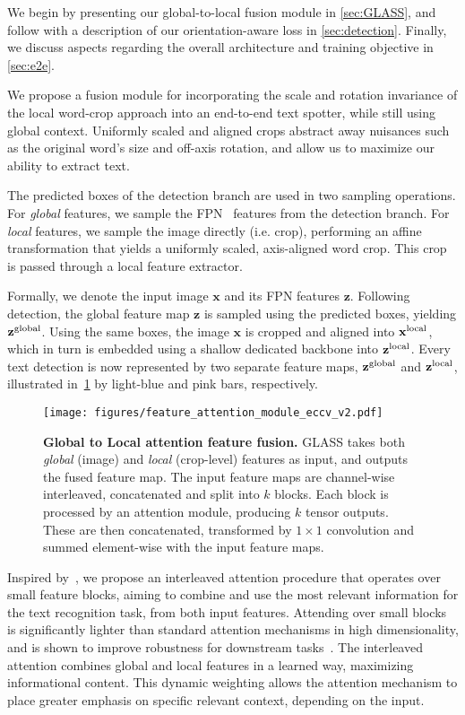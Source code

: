 \documentclass[runningheads]{llncs}
\begin{document}
We begin by presenting our global-to-local fusion module in \cref{sec:GLASS}, 
and follow with a description of our orientation-aware loss in \cref{sec:detection}.
Finally, we discuss aspects regarding the overall architecture and training objective in \cref{sec:e2e}.



We propose a fusion module for incorporating the scale and rotation invariance of the local word-crop approach into an end-to-end text spotter, while still using global context.
Uniformly scaled and aligned crops abstract away nuisances such as the original word's size and off-axis rotation, and allow us to maximize our ability to extract text.

The predicted boxes of the detection branch are used in two sampling operations.
For \emph{global} features, we sample the FPN~\cite{lin2017feature} features from the detection branch.
For \emph{local} features, we sample the image directly (i.e. crop), performing an affine transformation that yields a uniformly scaled, axis-aligned word crop.
This crop is passed through a local feature extractor. 

Formally, we denote the input image $\mathbf{x}$ and its FPN features $\mathbf{z}$.
Following detection, the global feature map $\mathbf{z}$ is sampled using the predicted boxes, yielding $\mathbf{z}^{\rm global}$.
Using the same boxes, the image $\mathbf{x}$ is cropped and aligned into $\mathbf{x}^{\rm local}$, which in turn is embedded using a shallow dedicated backbone into $\mathbf{z}^{\rm local}$.
Every text detection is now represented by two separate feature maps, $\mathbf{z}^{\rm global}$ and  $\mathbf{z}^{\rm local}$,
illustrated in~\cref{fig:featrefusion} by light-blue and pink bars, respectively.

\begin{figure}[t]
 \centering
  \texttt{[image: figures/feature\_attention\_module\_eccv\_v2.pdf]}
\caption{\textbf{Global to Local attention feature fusion.} GLASS takes both \emph{global} (image) and \emph{local} (crop-level) features as input, and outputs the fused feature map.
The input feature maps are channel-wise interleaved, concatenated and split into $k$ blocks. Each block is processed by an attention module, producing $k$ tensor outputs. These are then concatenated, transformed by $1\times 1$ convolution and summed element-wise with the input feature maps.
  }
  \label{fig:featrefusion}
\end{figure}

Inspired by~\cite{lu2021master}, we propose an interleaved attention procedure that operates over small feature blocks, aiming to combine and use the most relevant information for the text recognition task, from both input features.
Attending over small blocks is significantly lighter than standard attention mechanisms in high dimensionality, and is shown to improve robustness for downstream tasks~\cite{lu2021master}.
The interleaved attention combines global and local features in a learned way, maximizing informational content.
This dynamic weighting allows the attention mechanism to place greater emphasis on specific relevant context, depending on the input.
\end{document}
